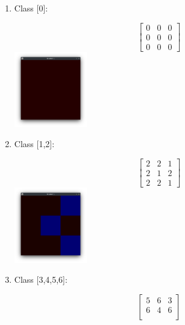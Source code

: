 \begin{enumerate}
    \item Class [0]:
    \begin{multicols}{2}
        \begin{equation*}
            \begin{bmatrix}
                0 & 0 & 0 \\
                0 & 0 & 0 \\
                0 & 0 & 0
            \end{bmatrix}
        \end{equation*}
        \columnbreak
        \includegraphics[width=0.25\textwidth]{./latex/img/m0}
    \end{multicols}
    \item Class [1,2]:
    \begin{multicols}{2}
        \begin{equation*}
            \begin{bmatrix}
                2 & 2 & 1 \\
                2 & 1 & 2 \\
                2 & 2 & 1
            \end{bmatrix}
        \end{equation*}
        \columnbreak
        \includegraphics[width=0.25\textwidth]{./latex/img/m1}
    \end{multicols}
    \item Class [3,4,5,6]:
    \begin{multicols}{2}
        \begin{equation*}
            \begin{bmatrix}
                5 & 6 & 3 \\
                6 & 4 & 6 \\

\end{bmatrix}
\end{equation*}
\end{multicols}
\end{enumerate}
